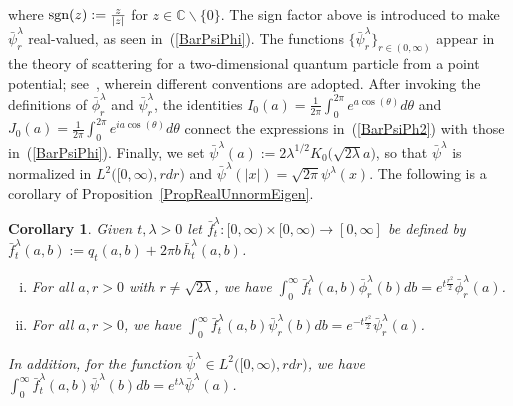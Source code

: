 \documentclass[10pt]{article}
\numberwithin{equation}{section}
\newtheorem{corollary}[theorem]{Corollary}
\theoremstyle{definition}
\newcommand{\C}{{\mathbb C}}
\begin{document}
\begin{appendix}
\begin{align}
\end{align}
where $\textup{sgn}(z):=\frac{z}{|z|}$ for  $z\in \C\backslash\{0\}$.  The  sign factor above is introduced to make $\bar{\psi}^{\lambda}_{r}$ real-valued, as seen in~(\ref{BarPsiPhi}).  The functions $\{\bar{\psi}^{\lambda}_{r}\}_{r\in (0,\infty)}$ appear in the theory of scattering for a two-dimensional quantum particle from a point potential;  see~\cite[pp.\ 100-101 \& (5.27)]{AGHH}, wherein different conventions are adopted.  After invoking the definitions of $\bar{\phi}^{\lambda}_{r}$ and $\bar{\psi}^{\lambda}_{r}$, the identities $I_0(a)=\frac{1}{2\pi}\int_0^{2\pi}e^{a\cos(\theta) }d\theta  $ and $J_0(a)=\frac{1}{2\pi}\int_0^{2\pi}e^{ia\cos(\theta) }d\theta  $ connect the expressions in~(\ref{BarPsiPh2}) with those in~(\ref{BarPsiPhi}).
Finally, we set $\bar{\psi}^{\lambda}(a):=2 \lambda^{1/2}K_0\big(\sqrt{2\lambda}  a\big)$, so that $\bar{\psi}^{\lambda}$ is normalized in $ L^2\big([0,\infty),  rdr\big)$ and $\bar{\psi}^{\lambda}(|x|)=\sqrt{2\pi}\psi^{\lambda}(x)$.  The following is a corollary  of Proposition~\ref{PropRealUnnormEigen}.
\begin{corollary}\label{CoroRealUnnormEigen} Given $t,\lambda>0$ let  $\bar{f}_t^{\lambda}:[0,\infty)\times [0,\infty)\rightarrow [0,\infty] $ be defined by $\bar{f}_t^{\lambda}(a,b):= q_t(a,b)+2\pi b\, \bar{h}_{t}^{\lambda}(a,b)$.
\begin{enumerate}[(i)]
    \item For all  $a,r >0$  with $r\neq \sqrt{2\lambda}$, we have $
\int_{0}^{\infty}  \bar{f}^{\lambda}_t(a,b)\bar{\phi}^{\lambda}_r(b)db =e^{t\frac{r^2}{2} }\bar{\phi}^{\lambda}_{r}(a) $. 
    
    \item For all  $a,r>0$, we have $\int_{0}^{\infty}  \bar{f}^{\lambda}_t(a,b)\bar{\psi}^{\lambda}_r(b)db =e^{-t\frac{r^2}{2} }\bar{\psi}^{\lambda}_{r}(a)$.



    
\end{enumerate}
In addition, for the function $\bar{\psi}^{\lambda}\in L^2\big([0,\infty),  rdr\big)$, we have  $
\int_{0}^{\infty} \bar{f}^{\lambda}_t(a,b)\bar{\psi}^{\lambda}(b)db =e^{t\lambda }\bar{\psi}^{\lambda}(a) $. 
    
\end{corollary}


\end{appendix}
\end{document}

